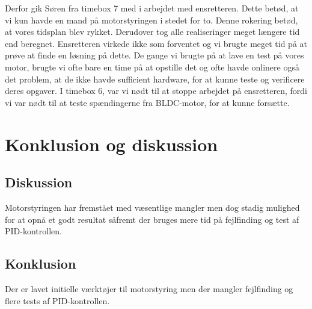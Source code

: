 Derfor gik Søren fra timebox 7 med i arbejdet med ensretteren. Dette betød, at vi kun havde en mand på motorstyringen i stedet for to. Denne rokering betød, at vores tidsplan blev rykket. Derudover tog alle realiseringer meget længere tid end beregnet. Ensretteren virkede ikke som forventet og vi brugte meget tid på at prøve at finde en løsning på dette. De  gange vi brugte på at lave en test på vores motor, brugte vi ofte bare en time på at opstille det og ofte havde onlinere også det problem, at de ikke havde sufficient hardware, for at kunne teste og verificere deres opgaver.
I timebox 6, var vi nødt til at stoppe arbejdet på ensretteren, fordi vi var nødt til at teste spændingerne fra BLDC-motor, for at kunne forsætte.

\chapter{Konklusion og diskussion}
\label{cha:konkl-og-disk}

\section{Diskussion}
\label{sec:diskussion}

Motorstyringen har fremstået med væsentlige mangler men dog stadig mulighed for at opnå et godt resultat såfremt der bruges mere tid på fejlfinding og test af PID-kontrollen.


\section{Konklusion}
\label{sec:konklusion}

Der er lavet initielle værktøjer til motorstyring men der mangler fejlfinding og flere tests af PID-kontrollen.


